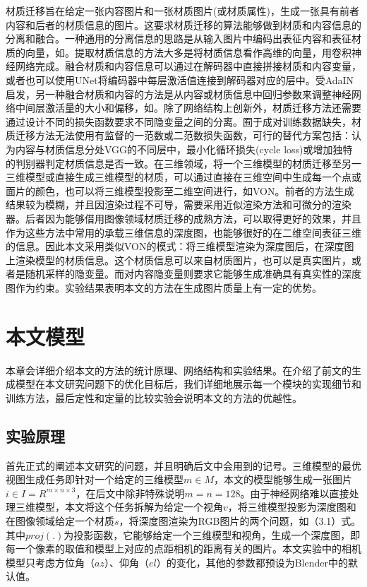 \documentclass[UTF8,openany,AutoFakeBold,AutoFakeSlant,cs4size]{ctexbook}
\begin{document}
材质迁移旨在给定一张内容图片和一张材质图片(或材质属性)，生成一张具有前者内容和后者的材质信息的图片。这要求材质迁移的算法能够做到材质和内容信息的分离和融合。一种通用的分离信息的思路是从输入图片中编码出表征内容和表征材质的向量，如\cite{zheng2019joint, BeautyGlow, Li2018BeautyGANIF, Wu2019DisentanglingCA}。提取材质信息的方法大多是将材质信息看作高维的向量，用卷积神经网络完成。融合材质和内容信息可以通过在解码器中直接拼接材质和内容变量，或者也可以使用UNet\cite{vunet2018}将编码器中每层激活值连接到解码器对应的层中。受AdaIN\cite{huang2017adain}启发，另一种融合材质和内容的方法是从内容或材质信息中回归参数来调整神经网络中间层激活量的大小和偏移，如\cite{zhu2019sean, park2019SPADE}。除了网络结构上创新外，材质迁移方法还需要通过设计不同的损失函数要求不同隐变量之间的分离。囿于成对训练数据缺失，材质迁移方法无法使用有监督的一范数或二范数损失函数，可行的替代方案包括：认为内容与材质信息分处VGG的不同层中\cite{7780634}，最小化循环损失(cycle loss)\cite{Lu2017ConditionalCF}或增加独特的判别器判定材质信息是否一致\cite{pix2pixSC2019, ma2017pose}。在三维领域，将一个三维模型的材质迁移至另一三维模型或直接生成三维模型的材质，可以通过直接在三维空间中生成每一个点或面片的颜色\cite{cmrKanazawa18}，也可以将三维模型投影至二维空间进行，如VON\cite{VON}。前者的方法生成结果较为模糊，并且因渲染过程不可导，需要采用近似渲染方法和可微分的渲染器\cite{Kato_2018_CVPR}。后者因为能够借用图像领域材质迁移的成熟方法，可以取得更好的效果，并且作为这些方法中常用的承载三维信息的深度图，也能够很好的在二维空间表征三维的信息。因此本文采用类似VON的模式：将三维模型渲染为深度图后，在深度图上渲染模型的材质信息。这个材质信息可以来自材质图片，也可以是真实图片，或者是随机采样的隐变量。而对内容隐变量则要求它能够生成准确具有真实性的深度图作为约束。实验结果表明本文的方法在生成图片质量上有一定的优势。



\clearpage

\chapter{本文模型}

本章会详细介绍本文的方法的统计原理、网络结构和实验结果。在介绍了前文的生成模型在本文研究问题下的优化目标后，我们详细地展示每一个模块的实现细节和训练方法，最后定性和定量的比较实验会说明本文的方法的优越性。

\section{实验原理}

首先正式的阐述本文研究的问题，并且明确后文中会用到的记号。三维模型的最优视图生成任务即针对一个给定的三维模型$m \in M$，本文的模型能够生成一张图片$i \in I = R^{m \times n \times 3}$，在后文中除非特殊说明$m = n = 128$。由于神经网络难以直接处理三维模型，本文将这个任务拆解为给定一个视角$v$，将三维模型投影为深度图和在图像领域给定一个材质$s$，将深度图渲染为RGB图片的两个问题，如（3.1）式。其中$proj(.)$为投影函数，它能够给定一个三维模型和视角，生成一个深度图，即每一个像素的取值和模型上对应的点距相机的距离有关的图片。本文实验中的相机模型只考虑方位角（$az$）、仰角（$el$）的变化，其他的参数都预设为Blender中的默认值。
\end{document}
